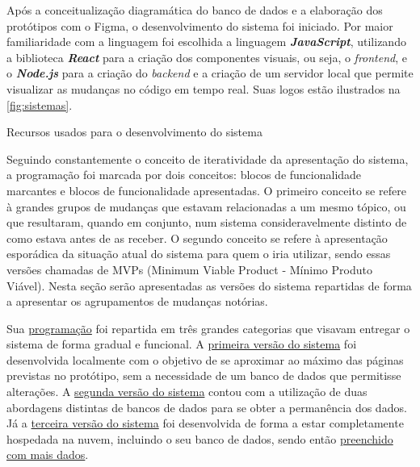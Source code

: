 Após a conceitualização diagramática do banco de dados e a elaboração dos protótipos com o Figma, o desenvolvimento do sistema foi iniciado. Por maior familiaridade com a linguagem foi escolhida a linguagem \textbf{\textit{JavaScript}}, utilizando a biblioteca \textbf{\textit{React}} para a criação dos componentes visuais, ou seja, o \textit{frontend}, e o \textbf{\textit{Node.js}} para a criação do \textit{backend} e a criação de um servidor local que permite visualizar as mudanças no código em tempo real. Suas logos estão ilustrados na \autoref{fig:sistemas}.

\begin{MyCenteredFigure} \caption{Recursos usados para o desenvolvimento do sistema} \label{fig:sistemas}
  \begin{animateinline}{1}
    \newframe
    \newframe
  \end{animateinline}
\end{MyCenteredFigure}

Seguindo constantemente o conceito de iteratividade da apresentação do sistema, a programação foi marcada por dois conceitos: blocos de funcionalidade marcantes e blocos de funcionalidade apresentadas. O primeiro conceito se refere à grandes grupos de mudanças que estavam relacionadas a um mesmo tópico, ou que resultaram, quando em conjunto, num sistema consideravelmente distinto de como estava antes de as receber. O segundo conceito se refere à apresentação esporádica da situação atual do sistema para quem o iria utilizar, sendo essas versões chamadas de MVPs (Minimum Viable Product - Mínimo Produto Viável). Nesta seção serão apresentadas as versões do sistema repartidas de forma a apresentar os agrupamentos de mudanças notórias.

Sua \hyperref[sec:programação]{programação} foi repartida em três grandes categorias que visavam entregar o sistema de forma gradual e funcional. A \hyperref[subsec:MVP1]{primeira versão do sistema} foi desenvolvida localmente com o objetivo de se aproximar ao máximo das páginas previstas no protótipo, sem a necessidade de um banco de dados que permitisse alterações. A \hyperref[subsec:MVP2]{segunda versão do sistema} contou com a utilização de duas abordagens distintas de bancos de dados para se obter a permanência dos dados. Já a \hyperref[subsec:MVP3]{terceira versão do sistema} foi desenvolvida de forma a estar completamente hospedada na nuvem, incluindo o seu banco de dados, sendo então \hyperref[sec:preenchimento]{preenchido com mais dados}.

